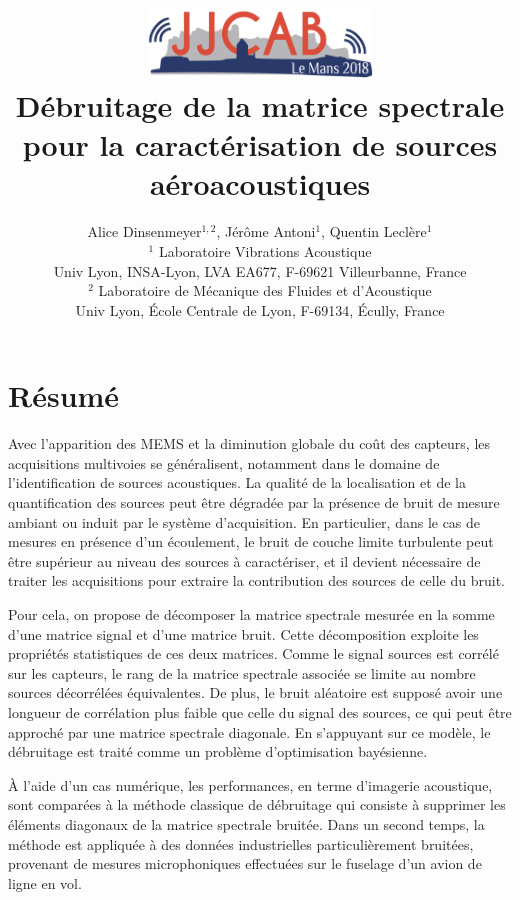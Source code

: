 \documentclass[12pt]{article}
\title{ 
\includegraphics[width=60mm]{logo_JJCAB_2018.png}\\
\textbf{Débruitage de la matrice spectrale pour la caractérisation de sources aéroacoustiques}} %
\author{
 \normalsize{Alice Dinsenmeyer$^{1,2}$, Jérôme Antoni$^1$, Quentin Leclère$^1$}\\[-0.4em]
 \small{$^1$ Laboratoire Vibrations Acoustique}\\[-0.4em]
 \small{Univ Lyon, INSA-Lyon, LVA EA677, F-69621 Villeurbanne, France}\\[-0.4em]
 \small{$^2$ Laboratoire de Mécanique des Fluides et d’Acoustique }\\[-0.4em]
 \small{Univ Lyon, École Centrale de Lyon, F-69134, Écully, France}
\date{}
}
\date{}
\begin{document}
\maketitle %

\thispagestyle{fancy} %

\section*{Résumé}


Avec l'apparition des MEMS et la diminution globale du coût des capteurs, les acquisitions multivoies se généralisent, notamment dans le domaine de l'identification de sources acoustiques. La qualité de la localisation et de la quantification des sources peut être dégradée par la présence de bruit de mesure ambiant ou induit par le système d'acquisition. En particulier, dans le cas de mesures en présence d'un écoulement, le bruit de couche limite turbulente peut être supérieur au niveau des sources à caractériser, et il devient nécessaire de traiter les acquisitions pour extraire la contribution des sources de celle du bruit.

 Pour cela, on propose de décomposer la matrice spectrale mesurée en la somme d'une matrice signal et d'une matrice bruit. Cette décomposition exploite les propriétés statistiques de ces deux matrices. Comme le signal sources est corrélé sur les capteurs, le rang de la matrice spectrale associée se limite au nombre sources décorrélées équivalentes. De plus, le bruit aléatoire est supposé avoir une longueur de corrélation plus faible que celle du signal des sources, ce qui peut être approché par une matrice spectrale diagonale. En s'appuyant sur ce modèle, le débruitage est traité comme un problème d'optimisation bayésienne. 
 
À l'aide d'un cas numérique, les performances, en terme d'imagerie acoustique, sont comparées à la méthode classique de débruitage qui consiste à supprimer les éléments diagonaux de la matrice spectrale bruitée.
Dans un second temps, la méthode est appliquée à des données industrielles particulièrement bruitées, provenant de mesures microphoniques effectuées sur le fuselage d'un avion de ligne en vol.
\end{document}
